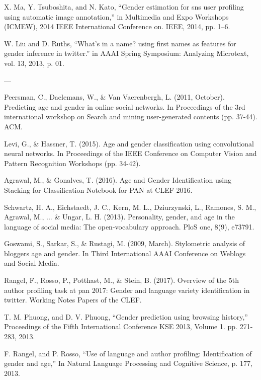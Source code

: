 \documentclass{article}
\begin{document}
X. Ma, Y. Tsuboshita, and N. Kato, “Gender estimation for sns user profiling using automatic image annotation,” in Multimedia and Expo Workshops (ICMEW), 2014 IEEE International Conference on. IEEE, 2014, pp. 1–6.

W. Liu and D. Ruths, “What’s in a name? using first names as features for gender inference in twitter.” in AAAI Spring Symposium: Analyzing Microtext, vol. 13, 2013, p. 01.

---

Peersman, C., Daelemans, W., & Van Vaerenbergh, L. (2011, October). Predicting age and gender in online social networks. In Proceedings of the 3rd international workshop on Search and mining user-generated contents (pp. 37-44). ACM.

Levi, G., & Hassner, T. (2015). Age and gender classification using convolutional neural networks. In Proceedings of the IEEE Conference on Computer Vision and Pattern Recognition Workshops (pp. 34-42).

Agrawal, M., & Gonalves, T. (2016). Age and Gender Identification using Stacking for Classification Notebook for PAN at CLEF 2016.

Schwartz, H. A., Eichstaedt, J. C., Kern, M. L., Dziurzynski, L., Ramones, S. M., Agrawal, M., ... & Ungar, L. H. (2013). Personality, gender, and age in the language of social media: The open-vocabulary approach. PloS one, 8(9), e73791.

Goswami, S., Sarkar, S., & Rustagi, M. (2009, March). Stylometric analysis of bloggers age and gender. In Third International AAAI Conference on Weblogs and Social Media.

Rangel, F., Rosso, P., Potthast, M., & Stein, B. (2017). Overview of the 5th author profiling task at pan 2017: Gender and language variety identification in twitter. Working Notes Papers of the CLEF.

T. M. Phuong, and D. V. Phuong, “Gender prediction using browsing history,” Proceedings of the Fifth International Conference KSE 2013, Volume 1. pp. 271-283, 2013.

F. Rangel, and P. Rosso, “Use of language and author profiling: Identification of gender and age,” In Natural Language Processing and Cognitive Science, p. 177, 2013.
\end{document}
